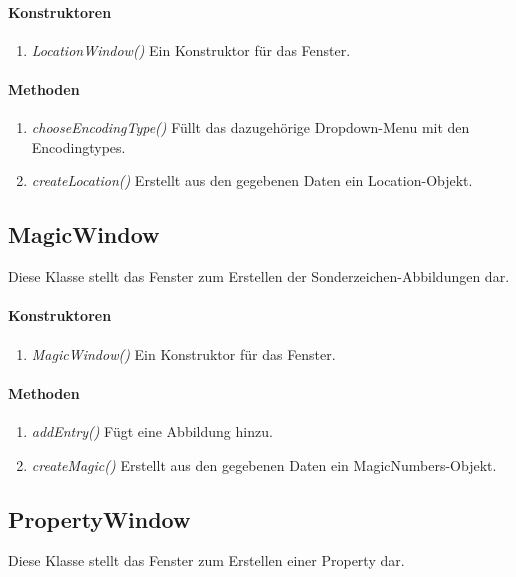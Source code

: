 \paragraph{Konstruktoren}
\begin{enumerate}[+]
	\item \textit{LocationWindow()} Ein Konstruktor für das Fenster.
\end{enumerate}

\paragraph{Methoden}

\begin{enumerate}[+]
	\item \textit{chooseEncodingType()} Füllt das dazugehörige Dropdown-Menu mit den Encodingtypes.
	\item \textit{createLocation()} Erstellt aus den gegebenen Daten ein Location-Objekt.
	
\end{enumerate}




\subsection*{MagicWindow}\label{MagicWindow}
Diese Klasse stellt das Fenster zum Erstellen der Sonderzeichen-Abbildungen dar.

\paragraph{Konstruktoren}
\begin{enumerate}[+]
	\item \textit{MagicWindow()} Ein Konstruktor für das Fenster.
\end{enumerate}

\paragraph{Methoden}

\begin{enumerate}[+]
	\item \textit{addEntry()} Fügt eine Abbildung hinzu.
	\item \textit{createMagic()} Erstellt aus den gegebenen Daten ein MagicNumbers-Objekt.	
\end{enumerate}



\subsection*{PropertyWindow}\label{PropertyWindow}
Diese Klasse stellt das Fenster zum Erstellen einer Property dar.

